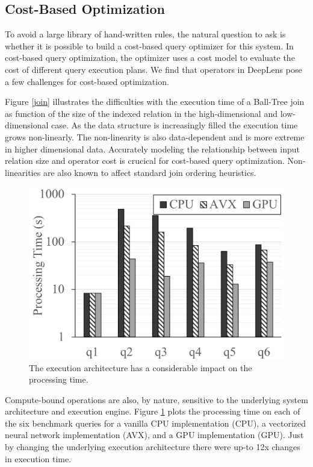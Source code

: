 \subsection{Cost-Based Optimization}
To avoid a large library of hand-written rules, the natural question to ask is whether it is possible to build a cost-based query optimizer for this system.
In cost-based query optimization, the optimizer uses a cost model to evaluate the cost of different query execution plans. We find that operators in \textsf{DeepLens} pose a few challenges for cost-based optimization. 

Figure \ref{join} illustrates the difficulties with the execution time of a Ball-Tree join as function of the size of the indexed relation in the high-dimensional and low-dimensional case. As the data structure is increasingly filled the execution time grows non-linearly. The non-linearity is also data-dependent and is more extreme in higher dimensional data. Accurately modeling the relationship between input relation size and operator cost is crucical for cost-based query optimization. Non-linearities are also known to affect standard join ordering heuristics.

\begin{figure}[t]
\centering
 \includegraphics[width=0.8\columnwidth]{figures/build.png}
 \caption{The execution architecture has a considerable impact on the processing time.  \label{build} }
\end{figure}

Compute-bound operations are also, by nature, sensitive to the underlying system architecture and execution engine. Figure \ref{build} plots the processing time on each of the six benchmark queries for a vanilla CPU implementation (CPU), a vectorized neural network implementation (AVX), and a GPU implementation (GPU). Just by changing the underlying execution architecture there were up-to 12x changes in execution time. 


